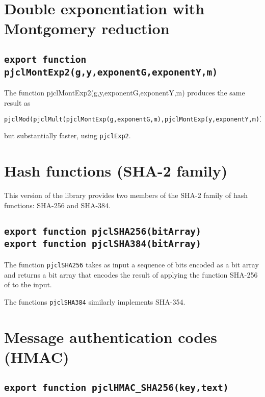 \documentclass[12pt]{article}
\begin{document}
\section{Double exponentiation with Montgomery reduction}

\subsection
[\tt export function pjclMontExp2(\\\mbox{}\hspace{.2in}g,y,exponentG,exponentY,m)]
{\tt export function pjclMontExp2(g,y,exponentG,exponentY,m)}

The function pjclMontExp2(g,y,exponentG,exponentY,m) produces the
same result as
\begin{verbatim}
pjclMod(pjclMult(pjclMontExp(g,exponentG,m),pjclMontExp(y,exponentY,m)),m)
\end{verbatim}
but substantially faster, using {\tt pjclExp2}.

\section{Hash functions (SHA-2 family)}

This version of the library provides two members of the SHA-2 family
of hash functions: SHA-256 and SHA-384.

\subsection{\tt export function pjclSHA256(bitArray)\\export function pjclSHA384(bitArray)}

The function {\tt pjclSHA256} takes as input a sequence of bits
encoded as a bit array and returns a bit array that encodes the result
of applying the function SHA-256 of \cite{FIPS180-4} to the input.

The functions {\tt pjclSHA384} similarly implements SHA-354.

\section{Message authentication codes (HMAC)}

\subsection{\tt export function pjclHMAC\_SHA256(key,text)}
\end{document}
